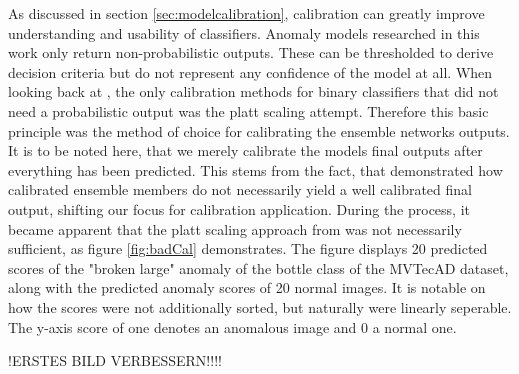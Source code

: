As discussed in section \ref{sec:modelcalibration}, calibration can greatly improve understanding and usability of classifiers. Anomaly models researched in this work only return non-probabilistic 
outputs. These can be thresholded to derive decision criteria but do not represent any confidence of the model at all. When looking back at \cite{Guo_2017_tempscalingetc}, the only calibration 
methods for binary classifiers that did not need a probabilistic output was the platt scaling attempt. Therefore this basic principle was the method of choice for calibrating the ensemble networks 
outputs. It is to be noted here, that we merely calibrate the models final outputs after everything has been predicted. This stems from the fact, that \cite{Wu_2021_shouldbecalibrated} demonstrated 
how calibrated ensemble members do not necessarily yield a well calibrated final output, shifting our focus for calibration application. During the process, it became apparent that the platt 
scaling approach from \cite{Guo_2017_tempscalingetc} was not necessarily sufficient, as figure \ref{fig:badCal} demonstrates. The figure displays 20 predicted scores of the "broken large" anomaly of the bottle class of the MVTecAD dataset, 
along with the predicted anomaly scores of 20 normal images. It is notable on how the scores were not additionally sorted, but naturally 
were linearly seperable. The y-axis score of one denotes an anomalous image and 0 a normal one.

!ERSTES BILD VERBESSERN!!!!

